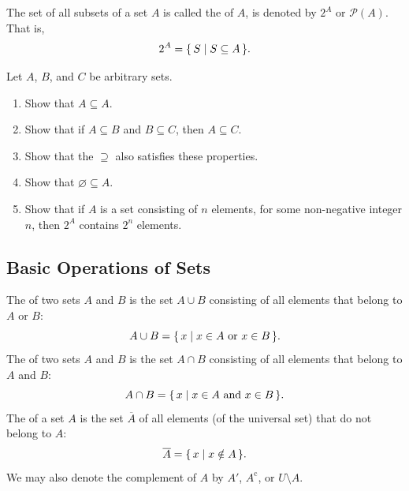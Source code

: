 The set of all subsets of a set $A$ is called the  of $A$, is denoted by $2^A$ or $\mathcal P(A)$. That is,
\begin{equation*}
2^A = \qty{\, S \mid S \subseteq A \,}.
\end{equation*}

\begin{Exercise}
Let $A$, $B$, and $C$ be arbitrary sets.
\begin{enumerate}
\item Show that $A \subseteq A$.
\item Show that if $A \subseteq B$ and $B \subseteq C$, then $A \subseteq C$.
\item Show that the $\supseteq$ also satisfies these properties.
\item Show that $\varnothing \subseteq A$.
\item Show that if $A$ is a set consisting of $n$ elements, for some non-negative integer $n$, then $2^A$ contains $2^n$ elements.
\end{enumerate}
\end{Exercise}

\subsection{Basic Operations of Sets}\label{subsec:BasicSetOps}

The  of two sets $A$ and $B$ is the set $A \cup B$ consisting of all elements that belong to $A$ or $B$:
\begin{equation*}
A \cup B = \qty{\, x \mid x \in A\ \text{or}\ x \in B\,}.
\end{equation*}
The  of two sets $A$ and $B$ is the set $A \cap B$ consisting of all elements that belong to $A$ and $B$:
\begin{equation*}
A \cap B = \qty{\, x \mid x \in A\ \text{and}\ x \in B\,}.
\end{equation*}
The  of a set $A$ is the set $\overline A$ of all elements (of the universal set) that do not belong to $A$:
\begin{equation*}
\overline A = \qty{\, x \mid x \notin A \,}.
\end{equation*}
We may also denote the complement of $A$ by $A'$, $A^{\mathrm c}$, or $U \setminus A$.

